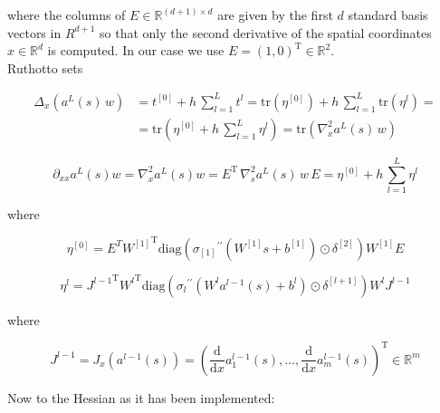 where the columns of $E \in \mathbb{R}^{\left(d+1\right) \times d}$ are given by the first $d$ standard basis vectors in $R^{d+1}$ so that only the second derivative of the spatial coordinates $x \in \mathbb{R}^d$ is computed. In our case we use $E = \left(1, 0\right)^{\mathrm{T}} \in \mathbb{R}^{2}$. \\
Ruthotto sets

\begin{align*}
    \Delta_x \left(a^{L}\left(s\right) \, w\right) & = t^{[0]} + h \, \sum^{L}_{l=1} t^{l} = \mathrm{tr}\left(\eta^{[0]}\right) + h \, \sum^{L}_{l=1} \mathrm{tr}\left(\eta^{l}\right) = \\
    & = \mathrm{tr} \left( \eta^{[0]} + h \, \sum^{L}_{l=1} \eta^{l} \right) = \mathrm{tr} \left( \nabla^{2}_x a^{L}\left(s\right) \, w \right)
\end{align*}

\begin{equation*}
    \partial_{xx} a^{L}\left(s\right) w = \nabla^{2}_x a^{L}\left(s\right) w = E^{\mathrm{T}} \, \nabla^{2}_s a^{L}\left(s\right) \, w \, E = \eta^{[0]} + h \, \sum^{L}_{l=1} \eta^{l}
\end{equation*}

where 

\begin{equation*}
    \eta^{[0]} = E^T {W^{[1]}}^{\mathrm{T}} \mathrm{diag}\left({\sigma_{[1]}}^{\prime \prime}\left(W^{[1]} s + b^{[1]}\right) \odot \delta^{[2]}\right) W^{[1]} E
\end{equation*}

\begin{equation*}
    \eta^{l} = {J^{l-1}}^{\mathrm{T}} {W^{l}}^{\mathrm{T}} \mathrm{diag}\left({\sigma_{l}}^{\prime \prime}\left(W^{l} a^{l-1}\left(s\right) + b^{l}\right) \odot \delta^{[l+1]}\right) W^{l} J^{l-1}
\end{equation*}

where 

\begin{equation*}
    J^{l-1} = J_x\left(a^{l-1}\left(s\right)\right) = \left( \frac{\mathrm{d}}{\mathrm{d} x} a^{l-1}_1\left(s\right), \ldots, \frac{\mathrm{d}}{\mathrm{d} x} a^{l-1}_m\left(s\right) \right)^{\mathrm{T}} \in \mathbb{R}^{m}
\end{equation*}


Now to the Hessian as it has been implemented: 

